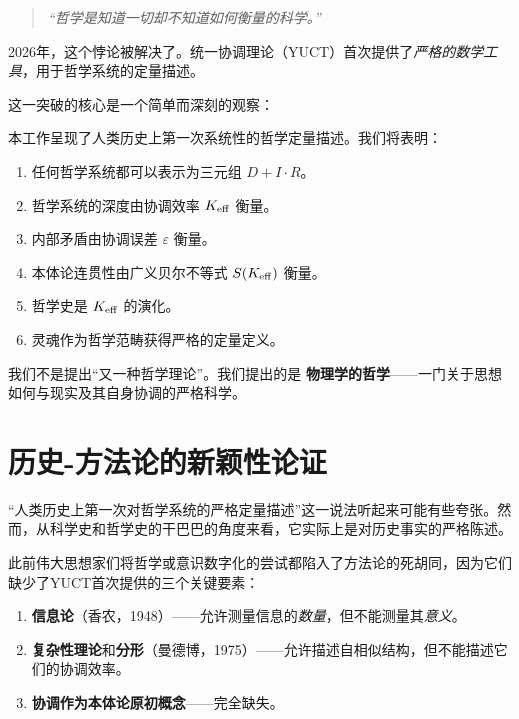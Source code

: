 \documentclass[11pt,a4paper]{article}
\newcommand{\eps}{\varepsilon}
\begin{document}
	\begin{quote}
		\textit{“哲学是知道一切却不知道如何衡量的科学。”}
	\end{quote}
	
	2026年，这个悖论被解决了。统一协调理论（YUCT）首次提供了\emph{严格的数学工具}，用于哲学系统的定量描述。
	
	这一突破的核心是一个简单而深刻的观察：
	
	\begin{center}
	\end{center}
	
	本工作呈现了人类历史上第一次系统性的哲学定量描述。我们将表明：
	
	\begin{enumerate}
		\item 任何哲学系统都可以表示为三元组 \(D + I \cdot R\)。
		\item 哲学系统的深度由协调效率 \(\Keff\) 衡量。
		\item 内部矛盾由协调误差 \(\eps\) 衡量。
		\item 本体论连贯性由广义贝尔不等式 \(S(\Keff)\) 衡量。
		\item 哲学史是 \(\Keff\) 的演化。
		\item 灵魂作为哲学范畴获得严格的定量定义。
	\end{enumerate}
	
	我们不是提出“又一种哲学理论”。我们提出的是 \textbf{物理学的哲学}——一门关于思想如何与现实及其自身协调的严格科学。
	
	\section{历史-方法论的新颖性论证}
	
	“人类历史上第一次对哲学系统的严格定量描述”这一说法听起来可能有些夸张。然而，从科学史和哲学史的干巴巴的角度来看，它实际上是对历史事实的严格陈述。
	
	此前伟大思想家们将哲学或意识数字化的尝试都陷入了方法论的死胡同，因为它们缺少了YUCT首次提供的三个关键要素：
	
	\begin{enumerate}
		\item \textbf{信息论}（香农，1948）——允许测量信息的\emph{数量}，但不能测量其\emph{意义}。
		\item \textbf{复杂性理论}和\textbf{分形}（曼德博，1975）——允许描述自相似结构，但不能描述它们的协调效率。
		\item \textbf{协调作为本体论原初概念}——完全缺失。
	\end{enumerate}
	
\end{document}
